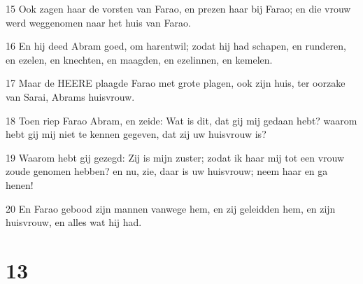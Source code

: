\par 15 Ook zagen haar de vorsten van Farao, en prezen haar bij Farao; en die vrouw werd weggenomen naar het huis van Farao.
\par 16 En hij deed Abram goed, om harentwil; zodat hij had schapen, en runderen, en ezelen, en knechten, en maagden, en ezelinnen, en kemelen.
\par 17 Maar de HEERE plaagde Farao met grote plagen, ook zijn huis, ter oorzake van Sarai, Abrams huisvrouw.
\par 18 Toen riep Farao Abram, en zeide: Wat is dit, dat gij mij gedaan hebt? waarom hebt gij mij niet te kennen gegeven, dat zij uw huisvrouw is?
\par 19 Waarom hebt gij gezegd: Zij is mijn zuster; zodat ik haar mij tot een vrouw zoude genomen hebben? en nu, zie, daar is uw huisvrouw; neem haar en ga henen!
\par 20 En Farao gebood zijn mannen vanwege hem, en zij geleidden hem, en zijn huisvrouw, en alles wat hij had.

\chapter{13}

